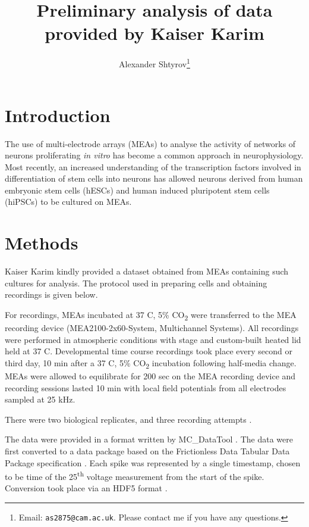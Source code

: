 \documentclass[10pt]{article}
\title{Preliminary analysis of data provided by Kaiser Karim}
\author{Alexander Shtyrov\footnote{Email: \texttt{as2875@cam.ac.uk}. Please contact me if you have any questions.}}
\begin{document}
\maketitle

\section{Introduction}
\par The use of multi-electrode arrays (MEAs) to analyse the activity of networks of neurons proliferating \textit{in vitro} has become a common approach in neurophysiology. Most recently, an increased understanding of the transcription factors involved in differentiation of stem cells into neurons has allowed neurons derived from human embryonic stem cells (hESCs) and human induced pluripotent stem cells (hiPSCs) to be cultured on MEAs.

\section{Methods}
\par Kaiser Karim kindly provided a dataset obtained from MEAs containing such cultures for analysis. The protocol used in preparing cells and obtaining recordings is given below.

\begin{displayquote}
For recordings, MEAs incubated at 37 \degree C, 5\% CO\textsubscript{2} were transferred to the MEA recording device (MEA2100-2x60-System, Multichannel Systems). All recordings were performed in atmospheric conditions with stage and custom-built heated lid held at 37 \degree C. Developmental time course recordings took place every second or third day, 10 min after a 37 \degree C, 5\% CO\textsubscript{2} incubation following half-media change. MEAs were allowed to equilibrate for 200 sec on the MEA recording device and recording sessions lasted 10 min with local field potentials from all electrodes sampled at 25 kHz.
\end{displayquote}

\par There were two biological replicates, and three recording attempts \cite{karim_personal_2020}.

\par The data were provided in a format written by MC\_DataTool \cite{multichannel_systems_mc_datatool_2014}. The data were first converted to a data package based on the Frictionless Data Tabular Data Package specification \cite{walsh_tabular_2017}. Each spike was represented by a single timestamp, chosen to be time of the 25\textsuperscript{th} voltage measurement from the start of the spike. Conversion took place via an HDF5 format \cite{eglen_data_2014}.
\end{document}
